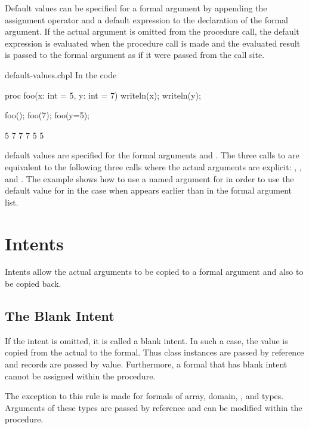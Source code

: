 Default values can be specified for a formal argument by appending the
assignment operator and a default expression to the declaration of the
formal argument.  If the actual argument is omitted from the procedure
call, the default expression is evaluated when the procedure call is
made and the evaluated result is passed to the formal argument as if
it were passed from the call site.

\begin{chapelexample}{default-values.chpl}
In the code
\begin{chapel}
proc foo(x: int = 5, y: int = 7) { writeln(x); writeln(y); }

foo();
foo(7);
foo(y=5);
\end{chapel}
\begin{chapeloutput}
5
7
7
7
5
5
\end{chapeloutput}
default values are specified for the formal arguments 
and .  The three calls to  are equivalent to the
following three calls where the actual arguments are
explicit: , , and .
The example  shows how to use a named argument
for  in order to use the default value for  in the
case when  appears earlier than  in the formal
argument list.
\end{chapelexample}


\section{Intents}
\label{Intents}

Intents allow the actual arguments to be copied to a formal argument
and also to be copied back.

\subsection{The Blank Intent}
\label{The_Blank_Intent}

If the intent is omitted, it is called a blank intent.  In such a
case, the value is copied from the actual to the formal.  Thus
class instances are passed by reference and records are passed by value.
Furthermore, a formal that has blank intent
cannot be assigned within the procedure.

The exception to this rule is made for formals of array, domain, ,
and  types. Arguments of these types are passed by reference
and can be modified within the procedure.

